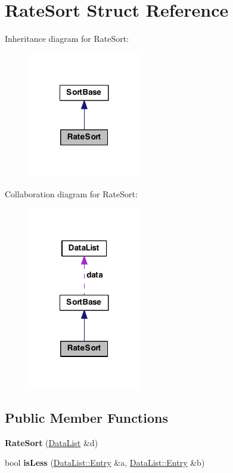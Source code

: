 \hypertarget{struct_rate_sort}{\section{Rate\-Sort Struct Reference}
\label{struct_rate_sort}
}


Inheritance diagram for Rate\-Sort\-:
\nopagebreak
\begin{figure}[H]
\begin{center}
\leavevmode
\includegraphics[width=140pt]{struct_rate_sort__inherit__graph}
\end{center}
\end{figure}


Collaboration diagram for Rate\-Sort\-:
\nopagebreak
\begin{figure}[H]
\begin{center}
\leavevmode
\includegraphics[width=140pt]{struct_rate_sort__coll__graph}
\end{center}
\end{figure}
\subsection*{Public Member Functions}
\begin{DoxyCompactItemize}
\item 
\hypertarget{struct_rate_sort_ac171c6c76faacffb5707dff02ef07f2e}{{\bfseries Rate\-Sort} (\hyperlink{struct_data_list}{Data\-List} \&d)}\label{struct_rate_sort_ac171c6c76faacffb5707dff02ef07f2e}

\item 
\hypertarget{struct_rate_sort_a7b71733cdbde194799aa0644c0796658}{bool {\bfseries is\-Less} (\hyperlink{struct_data_list_1_1_entry}{Data\-List\-::\-Entry} \&a, \hyperlink{struct_data_list_1_1_entry}{Data\-List\-::\-Entry} \&b)}\label{struct_rate_sort_a7b71733cdbde194799aa0644c0796658}

\end{DoxyCompactItemize}


